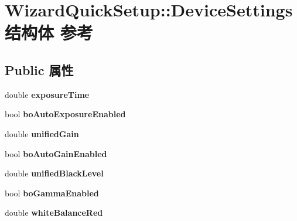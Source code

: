 \hypertarget{struct_wizard_quick_setup_1_1_device_settings}{\section{Wizard\+Quick\+Setup\+:\+:Device\+Settings结构体 参考}
\label{struct_wizard_quick_setup_1_1_device_settings}
}
\subsection*{Public 属性}
\begin{DoxyCompactItemize}
\item 
\hypertarget{struct_wizard_quick_setup_1_1_device_settings_a3a7f8bb0cd6c3fa846a6cd27edf8f3c0}{double {\bfseries exposure\+Time}}\label{struct_wizard_quick_setup_1_1_device_settings_a3a7f8bb0cd6c3fa846a6cd27edf8f3c0}

\item 
\hypertarget{struct_wizard_quick_setup_1_1_device_settings_acb1dd4eab1b0f9e14b6e9934d3af61c4}{bool {\bfseries bo\+Auto\+Exposure\+Enabled}}\label{struct_wizard_quick_setup_1_1_device_settings_acb1dd4eab1b0f9e14b6e9934d3af61c4}

\item 
\hypertarget{struct_wizard_quick_setup_1_1_device_settings_a8bfcb2313d1bf3fed6901446d14c4083}{double {\bfseries unified\+Gain}}\label{struct_wizard_quick_setup_1_1_device_settings_a8bfcb2313d1bf3fed6901446d14c4083}

\item 
\hypertarget{struct_wizard_quick_setup_1_1_device_settings_a99fda6b3bfbad2d9463d918b53773c05}{bool {\bfseries bo\+Auto\+Gain\+Enabled}}\label{struct_wizard_quick_setup_1_1_device_settings_a99fda6b3bfbad2d9463d918b53773c05}

\item 
\hypertarget{struct_wizard_quick_setup_1_1_device_settings_a9fea47660cdb2f5058139725c79ef7bb}{double {\bfseries unified\+Black\+Level}}\label{struct_wizard_quick_setup_1_1_device_settings_a9fea47660cdb2f5058139725c79ef7bb}

\item 
\hypertarget{struct_wizard_quick_setup_1_1_device_settings_a3da29d80fff2b8d26e62c079629319db}{bool {\bfseries bo\+Gamma\+Enabled}}\label{struct_wizard_quick_setup_1_1_device_settings_a3da29d80fff2b8d26e62c079629319db}

\item 
\hypertarget{struct_wizard_quick_setup_1_1_device_settings_aad8b7f967f1a59a882720c708d09b8fb}{double {\bfseries white\+Balance\+Red}}\label{struct_wizard_quick_setup_1_1_device_settings_aad8b7f967f1a59a882720c708d09b8fb}


\end{DoxyCompactItemize}
